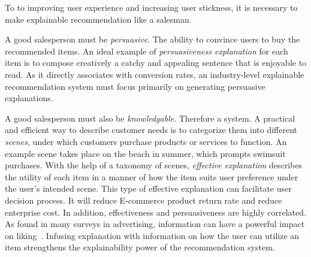 \documentclass[sigconf]{acmart}
\begin{document}
To to improving user experience and increasing user stickness, it is necessary to make explainable recommendation like a salesman.


A good salesperson must be \textit{persuasive}. The ability to convince users to buy the recommended items. 
An ideal example of \textit{persuasiveness explanation} for each item is to compose creatively a catchy and appealing sentence that is enjoyable to read.
As it directly associates with conversion rates, an industry-level explainable recommendation system must focus primarily on generating persuasive explanations.  

A good salesperson must also be \textit{knowledgable}. %
Therefore a  system. 
A practical and efficient way to describe customer needs is to categorize them into different \textit{scenes}, under which customers purchase products or services to function.
An example scene takes place on the beach in summer, which prompts swimsuit purchases. 
With the help of a taxonomy of scenes, \textit{effective explanation} describes the utility of each item in a manner of how the item suits user preference under the user's intended scene.
This type of effective explanation can facilitate user decision process. It will reduce E-commerce product return rate and reduce enterprise cost.
In addition, effectiveness and persuasiveness are highly correlated.  As found in many surveys in advertising, information can have a powerful impact on liking~\cite{}. Infusing explanation with information on how the user can utilize an item strengthens the explainability power of the recommendation system.  
\end{document}

